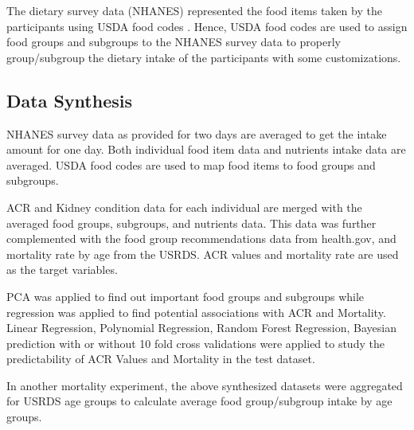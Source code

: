 \noindent The dietary survey data (NHANES) represented the food items taken by the participants using USDA food codes \cite{ARS2016} \cite{CDC2004} \cite{USDA2010}. Hence, USDA food codes \cite{ARS2016} \cite{CDC2004} \cite{USDA2010} are used to assign food groups and subgroups to the NHANES \cite{CDC2015} survey data to properly group/subgroup the dietary intake of the participants with some customizations.

\subsection{Data Synthesis}
\noindent NHANES survey data as provided for two days are averaged to get the intake amount for one day. Both individual food item data and nutrients intake data are averaged. USDA food codes are used to map food items to food groups and subgroups.

\noindent ACR and Kidney condition data for each individual are merged with the averaged food groups, subgroups, and nutrients data. This data was further complemented with the food group recommendations data from health.gov, and mortality rate by age from the USRDS. ACR values and mortality rate  are used as the target variables.

\noindent PCA was applied to find out important food groups and subgroups while regression was applied to find potential associations with ACR and Mortality. Linear Regression, Polynomial Regression, Random Forest Regression, Bayesian prediction with or without 10 fold cross validations were applied to study the predictability of ACR Values and Mortality in the test dataset. 

\noindent In another mortality experiment, the above synthesized datasets were aggregated for USRDS age  groups to calculate average food group/subgroup intake by age groups. 